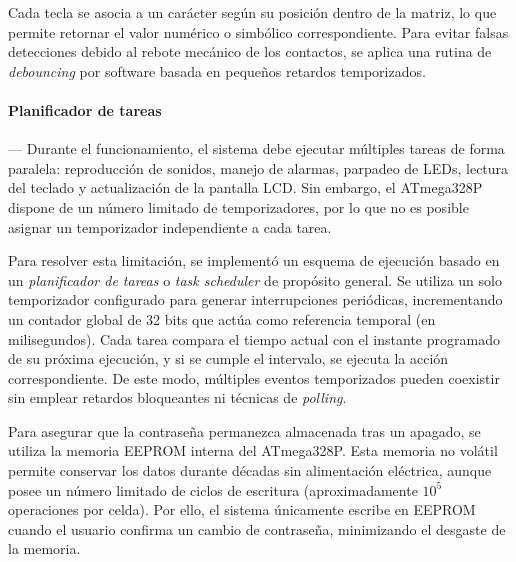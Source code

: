     \vspace{1em}

    Cada tecla se asocia a un carácter según su posición dentro de la matriz, lo que permite retornar el valor numérico o simbólico correspondiente. Para evitar falsas detecciones debido al rebote mecánico de los contactos, se aplica una rutina de \textit{debouncing} por software basada en pequeños retardos temporizados.

    \vspace{1em}

    \paragraph*{\textbf{Planificador de tareas}}---
    Durante el funcionamiento, el sistema debe ejecutar múltiples tareas de forma paralela: reproducción de sonidos, manejo de alarmas, parpadeo de LEDs, lectura del teclado y actualización de la pantalla LCD. Sin embargo, el ATmega328P dispone de un número limitado de temporizadores, por lo que no es posible asignar un temporizador independiente a cada tarea.

    \vspace{1em}

    Para resolver esta limitación, se implementó un esquema de ejecución basado en un \textit{planificador de tareas} o \textit{task scheduler} de propósito general. Se utiliza un solo temporizador configurado para generar interrupciones periódicas, incrementando un contador global de 32 bits que actúa como referencia temporal (en milisegundos). Cada tarea compara el tiempo actual con el instante programado de su próxima ejecución, y si se cumple el intervalo, se ejecuta la acción correspondiente. De este modo, múltiples eventos temporizados pueden coexistir sin emplear retardos bloqueantes ni técnicas de \textit{polling}.

    \vspace{1em}

    Para asegurar que la contraseña permanezca almacenada tras un apagado, se utiliza la memoria EEPROM interna del ATmega328P. Esta memoria no volátil permite conservar los datos durante décadas sin alimentación eléctrica, aunque posee un número limitado de ciclos de escritura (aproximadamente $10^5$ operaciones por celda). Por ello, el sistema únicamente escribe en EEPROM cuando el usuario confirma un cambio de contraseña, minimizando el desgaste de la memoria.

    \vspace{1em}

